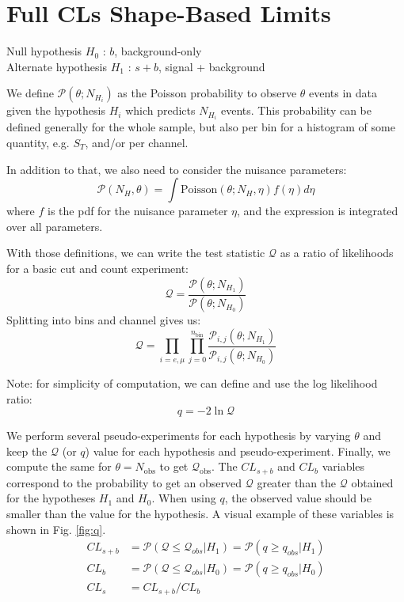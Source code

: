 \chapter{Full CLs Shape-Based Limits
\label{ch:limits}}

Null hypothesis $H_{0}$ : $b$, background-only \\
Alternate hypothesis $H_{1}$ : $s+b$, signal + background

We define $\mathcal{P}(\theta; N_{H_{i}})$ as the Poisson probability to observe $\theta$ events in data given the hypothesis $H_{i}$ which predicts $N_{H_{i}}$ events. This probability can be defined generally for the whole sample, but also per bin for a histogram of some quantity, e.g. $S_{T}$, and/or per channel.

In addition to that, we also need to consider the nuisance parameters:
\begin{equation}
\mathcal{P}(N_H,\theta) = \int \mbox{Poisson}(\theta; N_{H},\eta)f(\eta)d\eta
\end{equation}
where $f$ is the pdf for the nuisance parameter $\eta$, and the expression is integrated over all parameters.

With those definitions, we can write the test statistic $\mathcal{Q}$ as a ratio of likelihoods for a basic cut and count experiment:
\begin{equation}
\mathcal{Q} = \frac{\mathcal{P}(\theta; N_{H_{1}})}{\mathcal{P}(\theta; N_{H_{0}})}
\end{equation}
Splitting into bins and channel gives us:
\begin{equation}
\mathcal{Q} = \prod_{i=e,\mu}\prod_{j=0}^{n_{\text{bin}}} \frac{\mathcal{P}_{i,j}(\theta; N_{H_{1}})}{\mathcal{P}_{i,j}(\theta; N_{H_{0}})}
\end{equation}

Note: for simplicity of computation, we can define and use the log likelihood ratio:
\begin{equation}
q = -2 \ln \mathcal{Q}
\end{equation}

We perform several pseudo-experiments for each hypothesis by varying $\theta$ and keep the $\mathcal{Q}$ (or $q$) value for each hypothesis and pseudo-experiment. Finally, we compute the same for $\theta=N_{\text{obs}}$ to get $\mathcal{Q}_{\text{obs}}$.
The $CL_{s+b}$ and $CL_{b}$ variables correspond to the probability to get an observed $\mathcal{Q}$ greater than the $\mathcal{Q}$ obtained for the hypotheses $H_1$ and $H_0$. When using $q$, the observed value should be smaller than the value for the hypothesis. A visual example of these variables is shown in Fig. \ref{fig:q}.
\begin{align}
CL_{s+b} &= \mathcal{P}(\mathcal{Q} \leq \mathcal{Q}_{obs}|H_1) = \mathcal{P}(q \geq q_{obs}|H_1) \\
CL_{b} &= \mathcal{P}(\mathcal{Q} \leq \mathcal{Q}_{obs}|H_0) = \mathcal{P}(q \geq q_{obs}|H_0) \\
CL_{s} &= CL_{s+b}/CL_{b}
\end{align}


